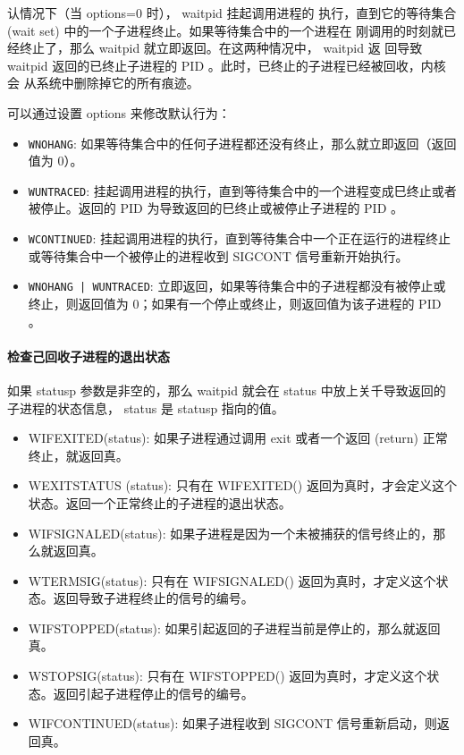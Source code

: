认情况下（当 options=0 时）， waitpid 挂起调用进程的
执行，直到它的等待集合 (wait set) 中的一个子进程终止。如果等待集合中的一个进程在
刚调用的时刻就已经终止了，那么 waitpid 就立即返回。在这两种情况中， waitpid 返
回导致 waitpid 返回的已终止子进程的 PID 。此时，已终止的子进程已经被回收，内核会
从系统中删除掉它的所有痕迹。

可以通过设置 options 来修改默认行为：
\begin{itemize}
    \item \texttt{WNOHANG}: 如果等待集合中的任何子进程都还没有终止，那么就立即返回（返回值为 0）。
    \item \texttt{WUNTRACED}: 挂起调用进程的执行，直到等待集合中的一个进程变成巳终止或者被停止。返回的 PID 为导致返回的巳终止或被停止子进程的 PID 。
    \item \texttt{WCONTINUED}: 挂起调用进程的执行，直到等待集合中一个正在运行的进程终止或等待集合中一个被停止的进程收到 SIGCONT 信号重新开始执行。
    \item \texttt{WNOHANG | WUNTRACED}: 立即返回，如果等待集合中的子进程都没有被停止或终止，则返回值为 0；如果有一个停止或终止，则返回值为该子进程的 PID 。
\end{itemize}

\paragraph{检查己回收子进程的退出状态}

如果 statusp 参数是非空的，那么 waitpid 就会在 status 中放上关千导致返回的
子进程的状态信息， status 是 statusp 指向的值。
\begin{itemize}
    \item WIFEXITED(status): 如果子进程通过调用 exit 或者一个返回 (return) 正常终止，就返回真。
    \item WEXITSTATUS (status): 只有在 WIFEXITED() 返回为真时，才会定义这个状态。返回一个正常终止的子进程的退出状态。
    \item WIFSIGNALED(status): 如果子进程是因为一个未被捕获的信号终止的，那么就返回真。
    \item WTERMSIG(status): 只有在 WIFSIGNALED() 返回为真时，才定义这个状态。返回导致子进程终止的信号的编号。
    \item WIFSTOPPED(status): 如果引起返回的子进程当前是停止的，那么就返回真。
    \item WSTOPSIG(status): 只有在 WIFSTOPPED() 返回为真时，才定义这个状态。返回引起子进程停止的信号的编号。
    \item WIFCONTINUED(status): 如果子进程收到 SIGCONT 信号重新启动，则返回真。
\end{itemize}

